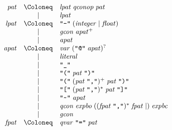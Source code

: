 \begin{align*}
  \begin{array}{rcl}
    \mathit{pat}
    & \Coloneq & \mathit{lpat}\; \mathit{qconop}\; \mathit{pat} \\
    & \mid & \mathit{lpat} \\
    \mathit{lpat}
    & \Coloneq & \text{\texttt{\textquotedbl -\textquotedbl}}\; (\mathit{integer} \mid \mathit{float}) \\
    & \mid & \mathit{gcon}\; \mathit{apat}^+ \\
    & \mid & \mathit{apat} \\
    \mathit{apat}
    & \Coloneq & \mathit{var}\; (\text{\texttt{\textquotedbl @\textquotedbl}}\; \mathit{apat})^? \\
    & \mid & \mathit{literal} \\
    & \mid & \text{\texttt{\textquotedbl\textunderscore\textquotedbl}} \\
    & \mid & \text{\texttt{\textquotedbl(\textquotedbl}}\; \mathit{pat}\; \text{\texttt{\textquotedbl)\textquotedbl}} \\
    & \mid & \text{\texttt{\textquotedbl(\textquotedbl}}\; (\mathit{pat}\; \text{\texttt{\textquotedbl,\textquotedbl}})^+\; \mathit{pat}\; \text{\texttt{\textquotedbl)\textquotedbl}} \\
    & \mid & \text{\texttt{\textquotedbl[\textquotedbl}}\; (\mathit{pat}\; \text{\texttt{\textquotedbl,\textquotedbl}})^*\; \mathit{pat}\; \text{\texttt{\textquotedbl]\textquotedbl}} \\
    & \mid & \text{\texttt{\textquotedbl\textasciitilde\textquotedbl}}\; \mathit{apat} \\
    & \mid & \mathit{qcon}\; \mathit{expbo}\; ((\mathit{fpat}\; \text{\texttt{\textquotedbl,\textquotedbl}})^*\; \mathit{fpat} \mid )\; \mathit{expbc} \\
    & \mid & \mathit{gcon} \\
    \mathit{fpat}
    & \Coloneq & \mathit{qvar}\; \text{\texttt{\textquotedbl =\textquotedbl}}\; \mathit{pat}
  \end{array}
\end{align*}


